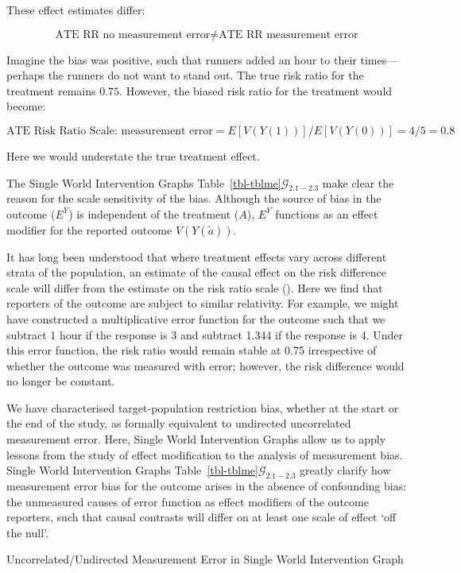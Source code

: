 \documentclass[
  single column]{article}
\begin{document}
These effect estimates differ:

\[\text{ATE RR no measurement error} \neq \text{ATE RR measurement error}\]

Imagine the bias was positive, such that runners added an hour to their
times---perhaps the runners do not want to stand out. The true risk
ratio for the treatment remains \(0.75\). However, the biased risk ratio
for the treatment would become:

\[
\text{ATE Risk Ratio Scale: measurement error} = E[V(Y(1))] / E[V(Y(0))] = 4 / 5 = 0.8
\]

Here we would understate the true treatment effect.

The Single World Intervention Graphs
Table~\ref{tbl-tblme}\(\mathcal{G}_{2.1-2.3}\) make clear the reason for
the scale sensitivity of the bias. Although the source of bias in the
outcome (\(E^Y\)) is independent of the treatment (\(A\)), \(E^Y\)
functions as an effect modifier for the reported outcome
\(V(Y(\tilde{a}))\).

It has long been understood that where treatment effects vary across
different strata of the population, an estimate of the causal effect on
the risk difference scale will differ from the estimate on the risk
ratio scale ().
Here we find that reporters of the outcome are subject to similar
relativity. For example, we might have constructed a multiplicative
error function for the outcome such that we subtract 1 hour if the
response is 3 and subtract 1.344 if the response is 4. Under this error
function, the risk ratio would remain stable at 0.75 irrespective of
whether the outcome was measured with error; however, the risk
difference would no longer be constant.

We have characterised target-population restriction bias, whether at the
start or the end of the study, as formally equivalent to undirected
uncorrelated measurement error. Here, Single World Intervention Graphs
allow us to apply lessons from the study of effect modification to the
analysis of measurement bias. Single World Intervention Graphs
Table~\ref{tbl-tblme}\(\mathcal{G}_{2.1-2.3}\) greatly clarify how
measurement error bias for the outcome arises in the absence of
confounding bias: the unmeasured causes of error function as effect
modifiers of the outcome reporters, such that causal contrasts will
differ on at least one scale of effect `off the null'.

\begin{table}

\caption{\label{tbl-tblswigme}Uncorrelated/Undirected Measurement Error
in Single World Intervention Graph}

\centering{

\tblswigmex

}

\end{table}%
\end{document}
